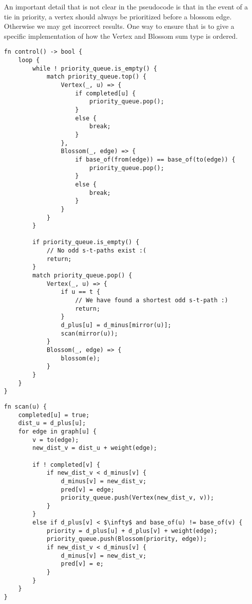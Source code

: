 An important detail that is not clear in the pseudocode is that in the event of a tie in priority, a vertex should always be prioritized before a blossom edge. Otherwise we may get incorrect results. One way to ensure that is to give a specific implementation of how the Vertex and Blossom sum type is ordered.
\begin{lstlisting}[caption={Control, the main loop},label=Listing,mathescape=true]
fn control() -> bool {
    loop {
        while ! priority_queue.is_empty() {
            match priority_queue.top() {
                Vertex(_, u) => {
                    if completed[u] {
                        priority_queue.pop();
                    }
                    else {
                        break;
                    }
                },
                Blossom(_, edge) => {
                    if base_of(from(edge)) == base_of(to(edge)) {
                        priority_queue.pop();
                    }
                    else {
                        break;
                    }
                }
            }
        }

        if priority_queue.is_empty() {
            // No odd s-t-paths exist :(
            return;
        }
        match priority_queue.pop() {
            Vertex(_, u) => {
                if u == t {
                    // We have found a shortest odd s-t-path :)
                    return;
                }
                d_plus[u] = d_minus[mirror(u)];
                scan(mirror(u));
            }
            Blossom(_, edge) => {
                blossom(e);
            }
        }
    }
}
\end{lstlisting}

\begin{lstlisting}[caption={Scan},label=Listing,mathescape=true]
fn scan(u) {
    completed[u] = true;
    dist_u = d_plus[u];
    for edge in graph[u] {
        v = to(edge);
        new_dist_v = dist_u + weight(edge);

        if ! completed[v] {
            if new_dist_v < d_minus[v] {
                d_minus[v] = new_dist_v;
                pred[v] = edge;
                priority_queue.push(Vertex(new_dist_v, v));
            }
        }
        else if d_plus[v] < $\infty$ and base_of(u) != base_of(v) {
            priority = d_plus[u] + d_plus[v] + weight(edge);
            priority_queue.push(Blossom(priority, edge));
            if new_dist_v < d_minus[v] {
                d_minus[v] = new_dist_v;
                pred[v] = e;
            }
        }
    }
}
\end{lstlisting}


